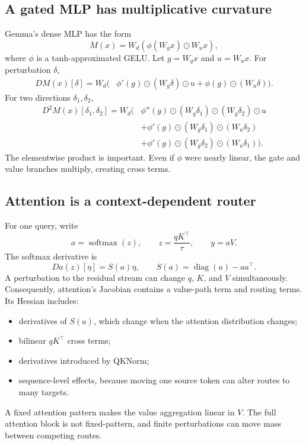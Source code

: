 \documentclass[11pt]{article}
\newcommand{\diag}{\operatorname{diag}}
\newcommand{\softmax}{\operatorname{softmax}}
\theoremstyle{definition}
\theoremstyle{remark}
\begin{document}
\subsection{A gated MLP has multiplicative curvature}
Gemma's dense MLP has the form
\begin{equation}
  M(x)=W_d\left(\phi(W_gx)\odot W_ux\right),
  \label{eq:gated_mlp}
\end{equation}
where $\phi$ is a tanh-approximated GELU. Let $g=W_gx$ and $u=W_ux$. For perturbation $\delta$,
\begin{align}
  DM(x)[\delta]
  =W_d\Big(&
    \phi'(g)\odot(W_g\delta)\odot u
    +\phi(g)\odot(W_u\delta)
  \Big).
  \label{eq:mlp_jac}
\end{align}
For two directions $\delta_1,\delta_2$,
\begin{align}
D^2M(x)[\delta_1,\delta_2]
=W_d\Big(&
 \phi''(g)\odot(W_g\delta_1)\odot(W_g\delta_2)\odot u
 \nonumber\\
 &+\phi'(g)\odot(W_g\delta_1)\odot(W_u\delta_2)
 \nonumber\\
 &+\phi'(g)\odot(W_g\delta_2)\odot(W_u\delta_1)
\Big).
\label{eq:mlp_hess}
\end{align}
The elementwise product is important. Even if $\phi$ were nearly linear, the gate and value branches multiply, creating cross terms.

\subsection{Attention is a context-dependent router}
For one query, write
\begin{equation}
  a=\softmax(z),\qquad z=\frac{qK^\top}{\tau},\qquad y=aV.
\end{equation}
The softmax derivative is
\begin{equation}
  Da(z)[\eta]
  =S(a)\eta,
  \qquad S(a)=\diag(a)-aa^\top.
  \label{eq:softmax_jac}
\end{equation}
A perturbation to the residual stream can change $q$, $K$, and $V$ simultaneously. Consequently, attention's Jacobian contains a value-path term and routing terms. Its Hessian includes:
\begin{itemize}
  \item derivatives of $S(a)$, which change when the attention distribution changes;
  \item bilinear $qK^\top$ cross terms;
  \item derivatives introduced by QKNorm;
  \item sequence-level effects, because moving one source token can alter routes to many targets.
\end{itemize}
A fixed attention pattern makes the value aggregation linear in $V$. The full attention block is not fixed-pattern, and finite perturbations can move mass between competing routes.
\end{document}
